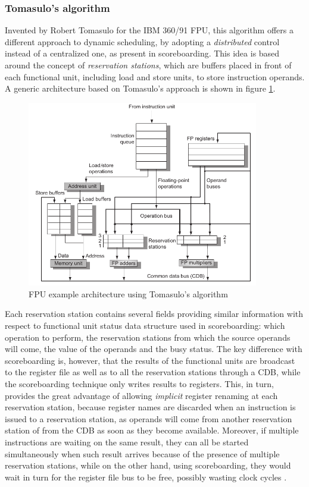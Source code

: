 \subsubsection{Tomasulo's algorithm}
Invented by Robert Tomasulo for the IBM 360/91 \ac{FPU}, this algorithm offers a different approach to dynamic scheduling, by adopting a \emph{distributed} control instead of a centralized one, as present in scoreboarding. This idea is based around the concept of \emph{reservation stations}, which are buffers placed in front of each functional unit, including load and store units, to store instruction operands. A generic architecture based on Tomasulo's approach is shown in figure \ref{fig:tomasulo}.
\begin{figure}[hbtp]
  \centering
  \includegraphics[width=0.9\textwidth]{img/tomasulo.pdf}
  \caption{\acs{FPU} example architecture using Tomasulo's algorithm \cite[p.~198]{hennessy17}}
  \label{fig:tomasulo}
\end{figure}

Each reservation station contains several fields providing similar information with respect to functional unit status data structure used in scoreboarding: which operation to perform, the reservation stations from which the source operands will come, the value of the operands and the busy status. The key difference with scoreboarding is, however, that the results of the functional units are broadcast to the register file as well as to all the reservation stations through a \ac{CDB}, while the scoreboarding technique only writes results to registers. This, in turn, provides the great advantage of allowing \emph{implicit} register renaming at each reservation station, because register names are discarded when an instruction is issued to a reservation station, as operands will come from another reservation station of from the \ac{CDB} as soon as they become available. Moreover, if multiple instructions are waiting on the same result, they can all be started simultaneously when such result arrives because of the presence of multiple reservation stations, while on the other hand, using scoreboarding, they would wait in turn for the register file bus to be free, possibly wasting clock cycles \cite[p.~201]{hennessy17}.

